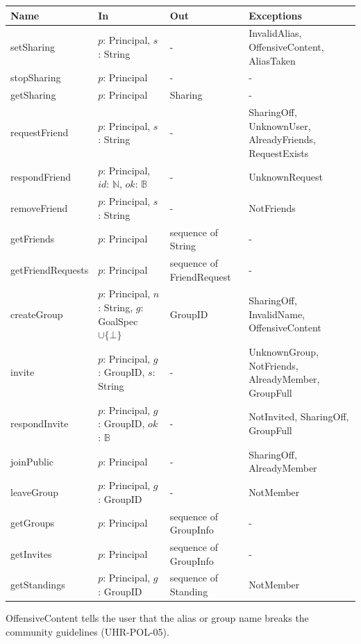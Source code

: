 \documentclass[12pt, titlepage]{article}
\begin{document}
\begin{center}
\renewcommand{\arraystretch}{1.2}
\begin{tabular}{>{\raggedright\arraybackslash}p{3.1cm}
  >{\raggedright\arraybackslash}p{4.4cm}
  >{\raggedright\arraybackslash}p{2.6cm}
  >{\raggedright\arraybackslash}p{3.9cm}}
\toprule
\textbf{Name} & \textbf{In} & \textbf{Out} & \textbf{Exceptions} \\
\midrule
setSharing & $p$: Principal, $s$: String & - & InvalidAlias,
  OffensiveContent, AliasTaken \\
stopSharing & $p$: Principal & - & - \\
getSharing & $p$: Principal & Sharing & - \\
requestFriend & $p$: Principal, $s$: String & - & SharingOff, UnknownUser,
  AlreadyFriends, RequestExists \\
respondFriend & $p$: Principal, $\mathit{id}$: $\mathbb{N}$, $\mathit{ok}$:
  $\mathbb{B}$ & - & UnknownRequest \\
removeFriend & $p$: Principal, $s$: String & - & NotFriends \\
getFriends & $p$: Principal & sequence of String & - \\
getFriend\-Requests & $p$: Principal & sequence of FriendRequest & - \\
createGroup & $p$: Principal, $n$: String, $g$: GoalSpec $\cup \{\bot\}$ &
  GroupID & SharingOff, InvalidName, OffensiveContent \\
invite & $p$: Principal, $g$: GroupID, $s$: String & - & UnknownGroup,
  NotFriends, AlreadyMember, GroupFull \\
respondInvite & $p$: Principal, $g$: GroupID, $\mathit{ok}$: $\mathbb{B}$ &
  - & NotInvited, SharingOff, GroupFull \\
joinPublic & $p$: Principal & - & SharingOff, AlreadyMember \\
leaveGroup & $p$: Principal, $g$: GroupID & - & NotMember \\
getGroups & $p$: Principal & sequence of GroupInfo & - \\
getInvites & $p$: Principal & sequence of GroupInfo & - \\
getStandings & $p$: Principal, $g$: GroupID & sequence of Standing &
  NotMember \\
\bottomrule
\end{tabular}
\end{center}

\noindent OffensiveContent tells the user that the alias or group name breaks
the community guidelines (UHR-POL-05).
\end{document}
